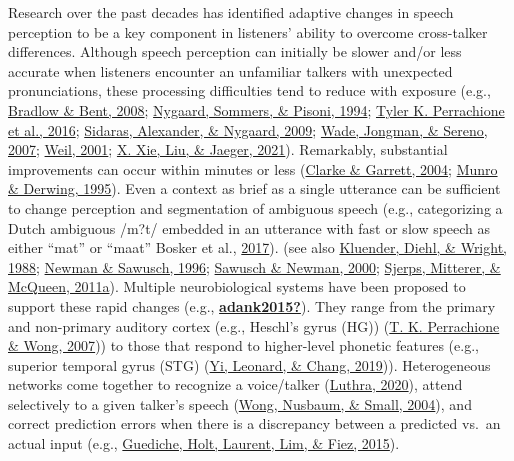 \documentclass[
  11pt,
  english,
  man,floatsintext]{apa6}
\begin{document}
Research over the past decades has identified adaptive changes in speech perception to be a key component in listeners' ability to overcome cross-talker differences. Although speech perception can initially be slower and/or less accurate when listeners encounter an unfamiliar talkers with unexpected pronunciations, these processing difficulties tend to reduce with exposure (e.g., \protect\hyperlink{ref-bradlow-bent2008}{Bradlow \& Bent, 2008}; \protect\hyperlink{ref-nygaard1994}{Nygaard, Sommers, \& Pisoni, 1994}; \protect\hyperlink{ref-Perrachione2016}{Tyler K. Perrachione et al., 2016}; \protect\hyperlink{ref-sidaras2009}{Sidaras, Alexander, \& Nygaard, 2009}; \protect\hyperlink{ref-wade2007}{Wade, Jongman, \& Sereno, 2007}; \protect\hyperlink{ref-weil2001a}{Weil, 2001}; \protect\hyperlink{ref-xie2021jep}{X. Xie, Liu, \& Jaeger, 2021}). Remarkably, substantial improvements can occur within minutes or less (\protect\hyperlink{ref-clarke-garrett2004}{Clarke \& Garrett, 2004}; \protect\hyperlink{ref-munro-derwing1995}{Munro \& Derwing, 1995}). Even a context as brief as a single utterance can be sufficient to change perception and segmentation of ambiguous speech (e.g., categorizing a Dutch ambiguous /m?t/ embedded in an utterance with fast or slow speech as either {``mat''} or {``maat''} Bosker et al., \protect\hyperlink{ref-bosker2017}{2017}). (see also \protect\hyperlink{ref-kluender1988}{Kluender, Diehl, \& Wright, 1988}; \protect\hyperlink{ref-newman-sawusch1996}{Newman \& Sawusch, 1996}; \protect\hyperlink{ref-sawusch-newman2000}{Sawusch \& Newman, 2000}; \protect\hyperlink{ref-sjerps2011}{Sjerps, Mitterer, \& McQueen, 2011a}). Multiple neurobiological systems have been proposed to support these rapid changes (e.g., \protect\hyperlink{ref-adank2015}{\textbf{adank2015?}}). They range from the primary and non-primary auditory cortex (e.g., Heschl's gyrus (HG)) (\protect\hyperlink{ref-Perrachione2007}{T. K. Perrachione \& Wong, 2007})) to those that respond to higher-level phonetic features (e.g., superior temporal gyrus (STG) (\protect\hyperlink{ref-Yi2019}{Yi, Leonard, \& Chang, 2019})). Heterogeneous networks come together to recognize a voice/talker (\protect\hyperlink{ref-luthra2020b}{Luthra, 2020}), attend selectively to a given talker's speech (\protect\hyperlink{ref-wong2004}{Wong, Nusbaum, \& Small, 2004}), and correct prediction errors when there is a discrepancy between a predicted vs.~an actual input (e.g., \protect\hyperlink{ref-guediche2015evidence}{Guediche, Holt, Laurent, Lim, \& Fiez, 2015}).
\end{document}
